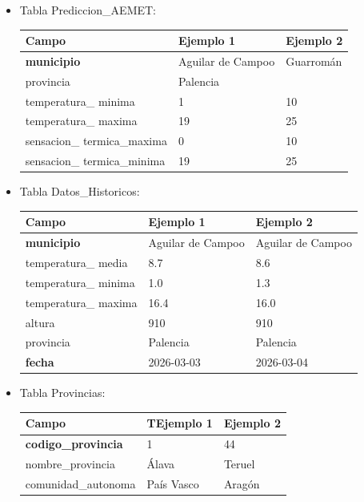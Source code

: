 \documentclass[12pt, a4paper]{article}
\begin{document}
\begin{itemize}
\item Tabla Prediccion\_AEMET:

\begin{center}
\begin{tabular}{|p{}|p{}|p{}|}
    \hline
    \textbf{Campo} & \textbf{Ejemplo 1} & \textbf{Ejemplo 2} \\
    \hline
    \textbf{municipio} & Aguilar de Campoo & Guarromán \\
    provincia & Palencia &  \\
    temperatura\_ minima & 1 & 10 \\
    temperatura\_ maxima & 19 & 25 \\
    sensacion\_ termica\_maxima & 0 & 10 \\
    sensacion\_ termica\_minima & 19 & 25 \\
    \hline
\end{tabular}
\end{center}

\newpage
\item Tabla Datos\_Historicos:

\begin{center}
\begin{tabular}{|p{}|p{}|p{}|}
    \hline
    \textbf{Campo} & \textbf{Ejemplo 1} & \textbf{Ejemplo 2} \\
    \hline
    \textbf{municipio} & Aguilar de Campoo & Aguilar de Campoo \\
    temperatura\_ media & 8.7 & 8.6 \\
    temperatura\_ minima & 1.0 & 1.3 \\
    temperatura\_ maxima & 16.4 & 16.0 \\
    altura & 910 & 910 \\
    provincia & Palencia & Palencia \\
    \textbf{fecha} & 2026-03-03 & 2026-03-04 \\
    \hline
\end{tabular}
\end{center}

\item Tabla Provincias: 
\begin{center}
\begin{tabular}{|p{}|p{}|p{}|}
    \hline
    \textbf{Campo} & \textbf{TEjemplo 1} & \textbf{Ejemplo 2} \\
    \hline
    \textbf{codigo\_provincia} & 1 & 44 \\
    nombre\_provincia & Álava & Teruel \\
    comunidad\_autonoma & País Vasco & Aragón \\
    \hline
\end{tabular}
\end{center}

\end{itemize}
\end{document}
